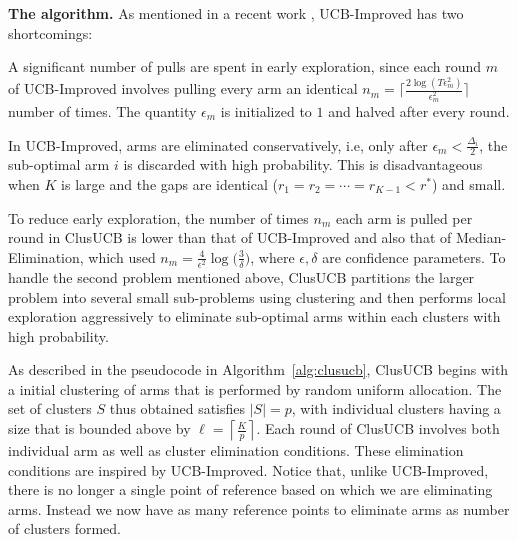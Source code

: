 
\textbf{The algorithm.} As mentioned in a recent work \cite{liu2016modification}, UCB-Improved has two shortcomings: 	\\
\begin{inparaenum}[\bfseries(i)]
\item A significant number of pulls are spent in early exploration, since each round $m$ of UCB-Improved involves pulling every arm an identical $n_{m}=\bigg\lceil \frac{ 2\log(T\epsilon^{2}_{m})}{\epsilon^{2}_{m}} \bigg\rceil$ number of times. The quantity $\epsilon_{m}$ is initialized to $1$ and halved after every round.\\
\item In UCB-Improved, arms are eliminated conservatively, i.e, only after $\epsilon_{m}<\frac{\Delta_{i}}{2}$, the sub-optimal arm $i$ is discarded with high probability. This is disadvantageous when $K$ is large and the gaps are identical ($r_{1}=r_{2}=\cdots=r_{K-1}<r^{*}$) and small.\\
\end{inparaenum}
To reduce early exploration, the number of times $n_m$ each arm is pulled per round in ClusUCB is lower than that of UCB-Improved and also that of Median-Elimination, which used $n_m=\frac{4}{\epsilon^{2}}\log\big(\frac{3}{\delta}\big)$, where $\epsilon,\delta$ are confidence parameters.
To handle the second problem mentioned above, ClusUCB partitions the larger problem into several small sub-problems using clustering and then performs local exploration aggressively to eliminate sub-optimal arms within each clusters with high probability.


As described in the pseudocode in Algorithm~\ref{alg:clusucb}, ClusUCB begins with a initial clustering of arms that is performed by random uniform allocation. The set of clusters $S$ thus obtained satisfies $|S|=p$, with individual clusters having a size that is bounded above by $\ell=\left\lceil \frac{K}{p} \right\rceil$.
Each round of ClusUCB involves both individual arm as well as cluster elimination conditions. These elimination conditions are inspired by UCB-Improved. Notice that, unlike UCB-Improved, there is no longer a single point of reference based on which we are eliminating arms. Instead we now have as many reference points to eliminate arms as number of clusters formed. 


